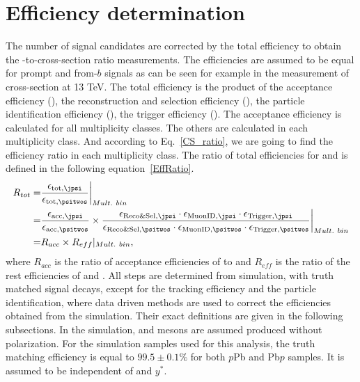 \section{Efficiency determination}
\label{Efficiency determination}
The number of signal candidates are corrected by the total efficiency to obtain the \psitwos-to-\jpsi cross-section ratio measurements. The efficiencies are assumed to be equal for prompt and from-$b$ signals as can be seen for example in the measurement of \jpsi cross-section at 13 TeV. The total efficiency is the product of the acceptance efficiency (\effAcc), the reconstruction and selection efficiency (\effReco), the particle identification efficiency (\effID), the trigger efficiency (\effTrigger). The acceptance efficiency is calculated for all multiplicity classes. The others are calculated in each multiplicity class. And according to Eq.~\ref{CS_ratio}, we are going to find the efficiency ratio in each multiplicity class. The ratio of total efficiencies for \jpsi and \psitwos is defined in the following equation~\ref{EffRatio}.
\begin{equation}
\begin{split}
R_{tot}=&\frac{\ensuremath{\epsilon_{\mathrm{tot,\jpsi}}}}{\ensuremath{\epsilon_{\mathrm{tot,\psitwos}}}}\bigg|_{Mult. \ bin} \\
= &\frac{\ensuremath{\epsilon_{\mathrm{acc,\jpsi}}}}{\ensuremath{\epsilon_{\mathrm{acc,\psitwos}}}}\times \frac{\ensuremath{\epsilon_{\mathrm{Reco\&Sel,\jpsi}}}\cdot\ensuremath{\epsilon_{\mathrm{MuonID,\jpsi}}}\cdot\ensuremath{\epsilon_{\mathrm{Trigger,\jpsi}}}}{\ensuremath{\epsilon_{\mathrm{Reco\&Sel,\psitwos}}}\cdot\ensuremath{\epsilon_{\mathrm{MuonID,\psitwos}}}\cdot\ensuremath{\epsilon_{\mathrm{Trigger,\psitwos}}}}\bigg|_{Mult. \ bin} \\
= &R_{acc}\times R_{eff}|_{Mult. \ bin},
\end{split}
\label{EffRatio}
\end{equation}
where $R_{acc}$ is the ratio of acceptance efficiencies of \jpsi to \psitwos and $R_{eff}$ is the ratio of the rest efficiencies of \jpsi and \psitwos. 
All steps are determined from simulation, with truth matched signal decays, except for the tracking efficiency and the particle identification, where data driven methods are used to correct the efficiencies obtained from the simulation. Their exact definitions are given in the following subsections. In the simulation, \jpsi and \psitwos mesons are assumed produced without polarization. For the simulation samples used for this analysis, the truth matching efficiency is equal to $99.5 \pm 0.1\%$ for both $p$Pb and Pb$p$ samples. It is assumed to be independent of \pt and $y^*$.

